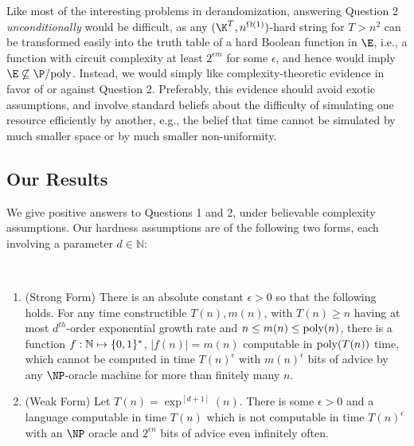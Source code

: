 Like most of the interesting problems in derandomization, answering Question 2 {\it unconditionally} would be difficult, as any $(\K^T, n^{\Omega(1)})$-hard string for $T > n^2$ can be transformed easily into the truth table of a hard Boolean function in $\E$, i.e., a function with circuit complexity at least $2^{\epsilon m}$ for some $\epsilon$, and hence would imply $\E \not\subseteq \P/\poly$. 
Instead, we would simply like complexity-theoretic evidence in favor of or against Question 2. Preferably, this evidence should avoid exotic assumptions, and involve standard beliefs about the difficulty of simulating one resource efficiently by another, e.g., the belief that time cannot be simulated by much smaller space or by much smaller non-uniformity. 


\subsection{Our Results}

We give positive answers to Questions 1 and 2, under believable complexity assumptions. Our hardness assumptions are of the following two forms, each involving a parameter $d \in \mathbb{N}$:
\begin{hypothesis*}\label{randomstrings:hyp:intro}
~
\begin{enumerate}
    \item (Strong Form) There is an absolute constant $\epsilon > 0$ so that the following holds. For any time constructible $T(n), m(n)$, with $T(n) \geq n$ having at most $d^{th}$-order exponential growth rate and $n \leq m(n) \leq \mathrm{poly}(n)$, there is a function $f:\mathbb{N} \mapsto \{0,1\}^{*}$, $|f(n)| =m(n)$ computable in $\mathrm{poly}(T(n))$ time, which cannot be computed in time $T(n)^\epsilon$ with $m(n)^\epsilon$ bits of advice by any $\NP$-oracle machine for more than finitely many $n$.
    \item (Weak Form) Let $T(n) = \exp^{[d+1]}(n)$. There is some $\epsilon>0$ and a language computable in time $T(n)$ which is not computable in time $T(n)^\epsilon$ with an $\NP$ oracle and $2^{\epsilon n}$ bits of advice even infinitely often.
\end{enumerate}
\end{hypothesis*}

